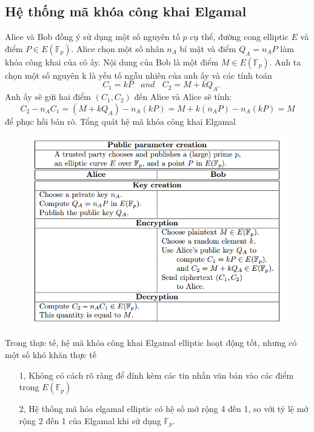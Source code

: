 \documentclass[a4paper,12pt]{report}
\begin{document}
\subsection*{Hệ thống mã khóa công khai Elgamal}
Alice và Bob đồng ý sử dụng một số nguyên tố $p$ cụ thể, đường cong elliptic $E$ và điểm $P \in E(\mathbb{F}_p)$. Alice chọn một số nhân $n_A$ bí mật và điểm $Q_A = n_AP$ làm khóa công khai của cô ấy. Nội dung của Bob là một điểm $M \in E(\mathbb{F}_p)$. Anh ta chọn một số nguyên k là yếu tố ngẫu nhiên của anh ấy và các tính toán
\begin{displaymath}
\ \ \ \ C_1 = kP \ \ \ \ and \ \ \ \ C_2 = M + kQ_A.
\end{displaymath}
Anh ấy sẽ gửi hai điểm $(C_1, C_2)$ đến Alice và Alice sẽ tính:
\begin{displaymath} 
C_2 - n_AC_1 = (M + kQ_A) - n_A(kP) = M + k(n_AP) - n_A(kP) = M
\end{displaymath}
để phục hồi bản rõ. Tổng quát hệ mã khóa công khai Elgamal \\
\begin{figure}[h]
\begin{center}
\includegraphics[scale=0.9]{../im5.png}
\caption{}
\end{center}
\end{figure}
Trong thực tế, hệ mã khóa công khai Elgamal elliptic hoạt động tốt, nhưng có một số khó khăn thực tế
\begin{itemize}
\item[1, ] Không có cách rõ ràng để đính kèm các tin nhắn văn bản vào các điểm trong $E(\mathbb{F}_p)$
\item[2, ] Hệ thống mã hóa elgamal elliptic có hệ số mở rộng 4 đến 1, so với tỷ lệ mở rộng 2 đến 1 của Elgamal khi sử dụng $\mathbb{F}_p$.
\end{itemize}
\end{document}
